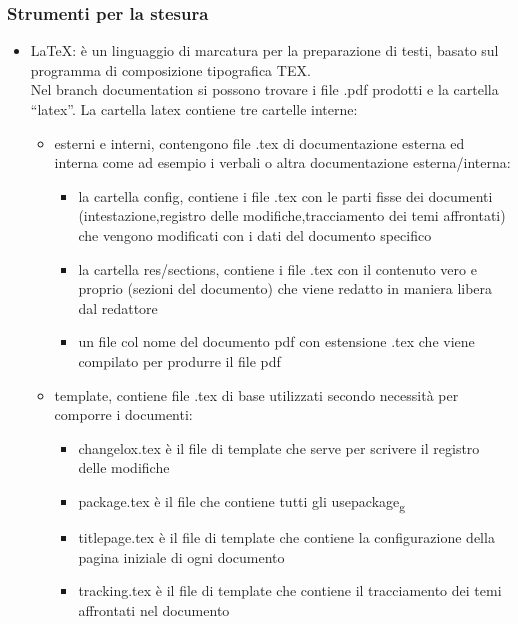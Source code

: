 \subsubsection{Strumenti per la stesura}
\begin{itemize} 
    \item LaTeX: è un linguaggio di marcatura per la preparazione di testi, basato sul 				  		  programma di composizione tipografica TEX.\\
	Nel branch documentation  si possono trovare i file .pdf prodotti e la cartella “latex”. La cartella latex contiene tre cartelle interne:
	\begin{itemize}
	\item esterni e interni, contengono file .tex di documentazione esterna ed interna come ad esempio i verbali o altra documentazione esterna/interna:
	\begin{itemize}
		\item la cartella config, contiene i file .tex con le parti fisse dei documenti (intestazione,registro delle modifiche,tracciamento dei temi affrontati) che vengono modificati con i dati del documento specifico 
		\item la cartella res/sections, contiene i file .tex con il contenuto vero e proprio (sezioni del documento) che viene redatto in maniera libera dal redattore
		\item un file col nome del documento pdf con estensione .tex che viene compilato per produrre il file pdf
	\end{itemize}
	 \item template, contiene file .tex di base utilizzati secondo necessità per comporre i documenti:
	 \begin{itemize}
	 \item changelox.tex è il file di template che serve per scrivere il registro delle modifiche
	 \item package.tex è il file che contiene tutti gli usepackage\textsubscript{g}
	 \item titlepage.tex è il file di template che contiene la configurazione della pagina iniziale di ogni documento  
	 \item tracking.tex è il file di template che contiene il tracciamento dei temi affrontati nel documento
	 \end{itemize}
	\end{itemize}
\end{itemize}